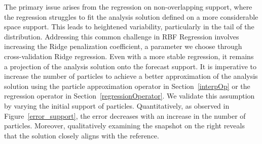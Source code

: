 The primary issue arises from the regression on non-overlapping support, where the regression struggles to fit the analysis solution defined on a more considerable space support. This leads to heightened variability, particularly in the tail of the distribution. Addressing this common challenge in RBF Regression \cite{fornberg_flyer_2015} involves increasing the Ridge penalization coefficient, a parameter we choose through cross-validation Ridge regression.
Even with a more stable regression, it remains a projection of the analysis solution onto the forecast support. It is imperative to increase the number of particles to achieve a better approximation of the analysis solution using the particle approximation operator in Section~\ref{interpOp} or the regression operator in Section~\ref{regressionOperator}.
We validate this assumption by varying the initial support of particles. Quantitatively, as observed in Figure~\ref{error_support}, the error decreases with an increase in the number of particles. Moreover, qualitatively examining the snapshot on the right reveals that the solution closely aligns with the reference.

